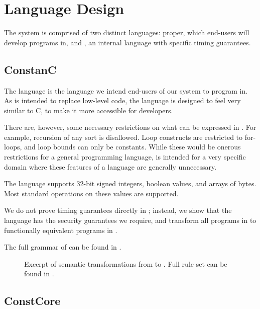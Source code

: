 \section{Language Design}
\label{sec:design}

The \constc system is comprised of two distinct languages: \constc proper, which end-users
will develop programs in, and \ccore, an internal language with specific timing guarantees.

\subsection{ConstanC}

The \constc language is the language we intend end-users of our system to program in.
As \constc is intended to replace low-level code, the language is designed to
feel very similar to C, to make it more accessible for developers.

There are, however, some necessary restrictions on what can be expressed in \constc.
For example, recursion of any sort is disallowed. Loop constructs are restricted to
for-loops, and loop bounds can only be constants. While these would be onerous restrictions for a general
programming language, \constc is intended for a very specific domain where these
features of a language are generally unnecessary.

The language supports 32-bit signed integers, boolean values, and arrays of bytes.
Most standard operations on these values are supported.

We do not prove timing guarantees directly in \constc; instead, we show
that the \ccore language has the security guarantees we require, and transform all programs
in \constc to functionally equivalent programs in \ccore.

The full grammar of \constc can be found in .

\begin{figure*}[t]
\begin{druleparx}[Stt]
\end{druleparx}
        \caption{Excerpt of semantic transformations from \constc to \ccore. Full rule set can be found in .}
    \label{fig:transform}
\end{figure*}

\subsection{ConstCore}

